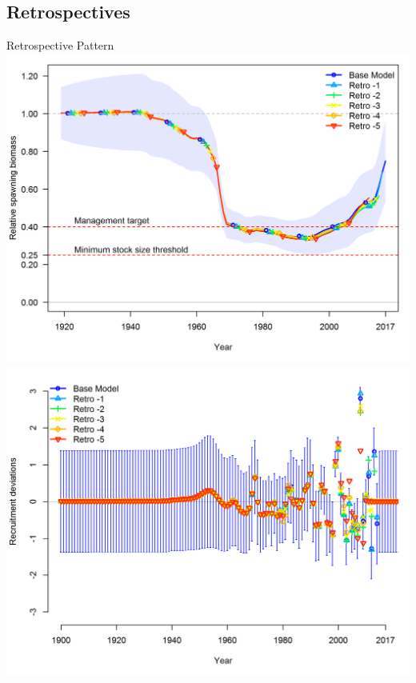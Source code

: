 \documentclass[pdf]{beamer}\usepackage[]{graphicx}\usepackage[]{color}
\begin{document}
\subsection{Retrospectives}
\begin{frame}{Retrospective Pattern}
  \includegraphics[scale = 0.37]{figures/compare4_Bratio_uncertainty.png}
  \includegraphics[scale = 0.37]{figures/compare10_recdevs_uncertainty.png}
\end{frame}
\end{document}
